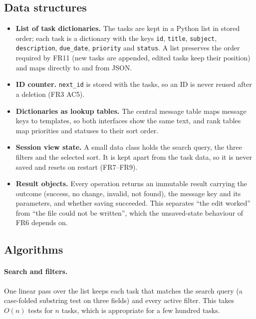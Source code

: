 \documentclass[11pt,a4paper]{article}
\newcommand{\code}[1]{\texttt{#1}}
\begin{document}
\subsection{Data structures}
\begin{itemize}
  \item \textbf{List of task dictionaries.} The tasks are kept in a Python
        list in stored order; each task is a dictionary with the keys
        \code{id}, \code{title}, \code{subject}, \code{description},
        \code{due\_date}, \code{priority} and \code{status}. A list preserves
        the order required by FR11 (new tasks are appended, edited tasks keep
        their position) and maps directly to and from JSON.
  \item \textbf{ID counter.} \code{next\_id} is stored with the tasks, so an ID
        is never reused after a deletion (FR3 AC5).
  \item \textbf{Dictionaries as lookup tables.} The central message table maps
        message keys to templates, so both interfaces show the same text, and
        rank tables map priorities and statuses to their sort order.
  \item \textbf{Session view state.} A small data class holds the search query,
        the three filters and the selected sort. It is kept apart from the
        task data, so it is never saved and resets on restart (FR7--FR9).
  \item \textbf{Result objects.} Every operation returns an immutable result
        carrying the outcome (success, no change, invalid, not found), the
        message key and its parameters, and whether saving succeeded. This
        separates \enquote{the edit worked} from \enquote{the file could not be
        written}, which the unsaved-state behaviour of FR6 depends on.
\end{itemize}

\subsection{Algorithms}
\paragraph{Search and filters.} One linear pass over the list keeps each task
that matches the search query (a case-folded substring test on three fields)
and every active filter. This takes $O(n)$ tests for $n$ tasks, which is
appropriate for a few hundred tasks.
\end{document}
